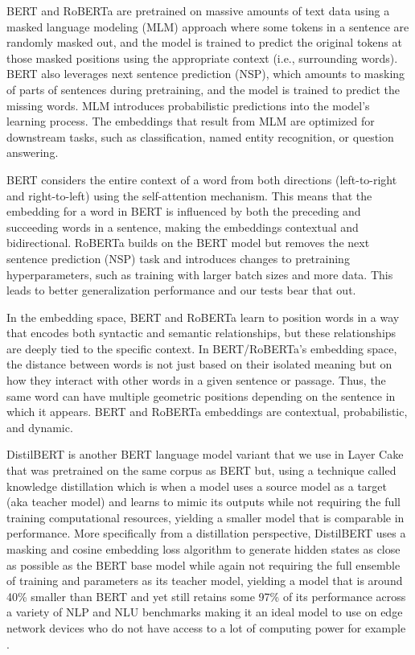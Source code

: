 \documentclass[final]{clv2025}
\begin{document}
BERT \cite{devlin-etal-2019-bert} and RoBERTa \cite{liu2019roberta} are pretrained on massive amounts of text data using a masked language modeling (MLM) approach where some tokens in a sentence are randomly masked out, and the model is trained to predict the original tokens at those masked positions using the appropriate context (i.e., surrounding words). BERT also leverages next sentence prediction (NSP), which amounts to masking of parts of sentences during pretraining, and the model is trained to predict the missing words. MLM introduces probabilistic predictions into the model’s learning process. The embeddings that result from MLM are optimized for downstream tasks, such as classification, named entity recognition, or question answering. 

BERT considers the entire context of a word from both directions (left-to-right and right-to-left) using the self-attention mechanism. This means that the embedding for a word in BERT is influenced by both the preceding and succeeding words in a sentence, making the embeddings contextual and bidirectional. RoBERTa builds on the BERT model but removes the next sentence prediction (NSP) task and introduces changes to pretraining hyperparameters, such as training with larger batch sizes and more data. This leads to better generalization performance and our tests bear that out. 

In the embedding space, BERT and RoBERTa learn to position words in a way that encodes both syntactic and semantic relationships, but these relationships are deeply tied to the specific context. In BERT/RoBERTa's embedding space, the distance between words is not just based on their isolated meaning but on how they interact with other words in a given sentence or passage. Thus, the same word can have multiple geometric positions depending on the sentence in which it appears. BERT and RoBERTa embeddings are contextual, probabilistic, and dynamic.

DistilBERT is another BERT language model variant that we use in Layer Cake that was pretrained on the same corpus as BERT but, using a technique called knowledge distillation \cite{hinton2015distilling} which is when a model uses a source model as a target (aka teacher model) and learns to mimic its outputs while not requiring the full training computational resources, yielding a smaller model that is comparable in performance. More specifically from a distillation perspective, DistilBERT uses a masking and cosine embedding loss algorithm to generate hidden states as close as possible as the BERT base model while again not requiring the full ensemble of training and parameters as its teacher model, yielding a model that is around 40\% smaller than BERT and yet still retains some 97\% of its performance across a variety of NLP and NLU benchmarks making it an ideal model to use on edge network devices who do not have access to a lot of computing power for example \cite{sanh2020distilbert}.
\end{document}
